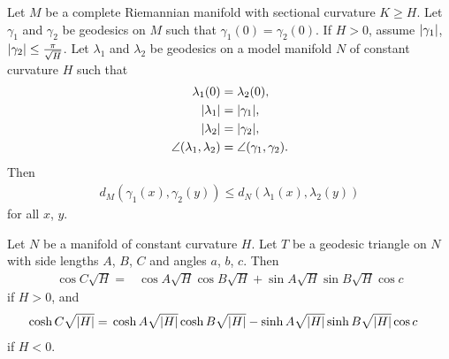 \documentclass[english, a4paper, 12pt]{article}
\begin{document}
\begin{theorem}[Toponogov]\label{thm:toponogov}
	Let $M$ be a complete Riemannian manifold with sectional curvature $K \geq H$.
	Let $\gamma_1$ and $\gamma_2$ be geodesics on $M$ such that $\gamma_1(0) = \gamma_2(0)$.
	If $H > 0$, assume $\abs{\gamma_1}$, $\abs{\gamma_2} \leq \frac{\pi}{\sqrt{H}}$.
	Let $\lambda_1$ and $\lambda_2$ be geodesics on a model manifold $N$ of constant curvature $H$ such that
	\begin{align}
		\lambda_1(0) ={}& \lambda_2(0),\\
		\abs{\lambda_1} ={}& \abs{\gamma_1},\\
		\abs{\lambda_2} ={}& \abs{\gamma_2},\\
		\angle(\lambda_1, \lambda_2) ={}& \angle(\gamma_1, \gamma_2).
	\end{align}
	Then
	\begin{align}
		d_{M}(\gamma_1(x), \gamma_2(y)) \leq d_{N}(\lambda_1(x), \lambda_2(y))
	\end{align}
	for all $x$, $y$.
\end{theorem}

\begin{lemma}\label{lemma:law_of_cosines}
	Let $N$ be a manifold of constant curvature $H$.
	Let $T$ be a geodesic triangle on $N$ with side lengths $A$, $B$, $C$ and angles $a$, $b$, $c$.
	Then
	\begin{align}
		\cos{C \sqrt{H}} ={}& \cos{A \sqrt{H}} \cos{B \sqrt{H}} + \sin{A \sqrt{H}} \sin{B \sqrt{H}} \cos{c}
	\end{align}
	if $H > 0$, and
	\begin{align}
		\cosh{C \sqrt{\abs{H}}} ={}& \cosh{A \sqrt{\abs{H}}} \cosh{B \sqrt{\abs{H}}} - \sinh{A \sqrt{\abs{H}}} \sinh{B \sqrt{\abs{H}}} \cos{c}
	\end{align}
	if $H < 0$.
\end{lemma}

\bigskip
\end{document}
